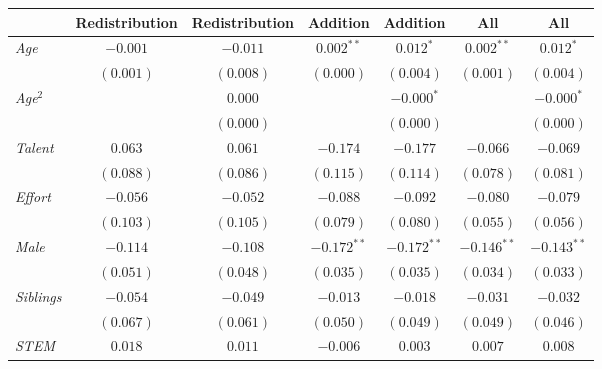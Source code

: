 
\begin{table}[H]
\begin{center}
\begin{footnotesize}
\begin{tabular}{l c c c c c c}
\toprule
 & Redistribution & Redistribution & Addition & Addition & All & All \\
\midrule
\textit{Age}                                  & $-0.001$      & $-0.011$      & $0.002^{**}$  & $0.012^{*}$   & $0.002^{**}$  & $0.012^{*}$   \\
                                              & $(0.001)$     & $(0.008)$     & $(0.000)$     & $(0.004)$     & $(0.001)$     & $(0.004)$     \\
\textit{Age}$^2$                              &               & $0.000$       &               & $-0.000^{*}$  &               & $-0.000^{*}$  \\
                                              &               & $(0.000)$     &               & $(0.000)$     &               & $(0.000)$     \\
\textit{Talent}                               & $0.063$       & $0.061$       & $-0.174$      & $-0.177$      & $-0.066$      & $-0.069$      \\
                                              & $(0.088)$     & $(0.086)$     & $(0.115)$     & $(0.114)$     & $(0.078)$     & $(0.081)$     \\
\textit{Effort}                               & $-0.056$      & $-0.052$      & $-0.088$      & $-0.092$      & $-0.080$      & $-0.079$      \\
                                              & $(0.103)$     & $(0.105)$     & $(0.079)$     & $(0.080)$     & $(0.055)$     & $(0.056)$     \\
\textit{Male}                                 & $-0.114$      & $-0.108$      & $-0.172^{**}$ & $-0.172^{**}$ & $-0.146^{**}$ & $-0.143^{**}$ \\
                                              & $(0.051)$     & $(0.048)$     & $(0.035)$     & $(0.035)$     & $(0.034)$     & $(0.033)$     \\
\textit{Siblings}                             & $-0.054$      & $-0.049$      & $-0.013$      & $-0.018$      & $-0.031$      & $-0.032$      \\
                                              & $(0.067)$     & $(0.061)$     & $(0.050)$     & $(0.049)$     & $(0.049)$     & $(0.046)$     \\
\textit{STEM}                                 & $0.018$       & $0.011$       & $-0.006$      & $0.003$       & $0.007$       & $0.008$       \\

\end{tabular}
\end{footnotesize}
\end{center}
\end{table}
